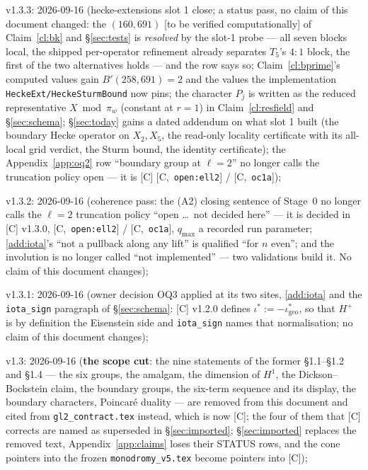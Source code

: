 \documentclass[11pt]{article}
\theoremstyle{remark}
\newcommand{\HA}[1]{[C,~\texttt{#1}]}      %
\newcommand{\VERIFY}{\textsf{[to be verified computationally]}}
\begin{document}
v1.3.3: 2026-09-16 (hecke-extensions slot 1 close; a status pass, no claim of
this document changed: the $(160,691)$ \VERIFY{} of Claim~\ref{cl:bk} and \S\ref{sec:tests} is
\emph{resolved} by the slot-1 probe --- all seven blocks local, the shipped per-operator
refinement already separates $T_5$'s $4{:}1$ block, the first of the two alternatives holds ---
and the row says so; Claim~\ref{cl:bprime}'s computed values gain $B'(258,691)=2$ and the values
the implementation \texttt{HeckeExt/HeckeSturmBound} now pins; the character $P_j$ is written
as the reduced representative $X\bmod\pi_w$ (constant at $r=1$) in Claim~\ref{cl:resfield}
and \S\ref{sec:schema}; \S\ref{sec:today} gains a dated addendum on what slot 1 built
(the boundary Hecke operator on $X_2,X_5$, the read-only locality certificate with its
all-local grid verdict, the Sturm bound, the identity certificate); the Appendix~\ref{app:oq2}
row ``boundary group at $\ell=2$'' no longer calls the truncation policy open --- it is
[C] \HA{open:ell2} / \HA{oc1a});

v1.3.2: 2026-09-16 (coherence pass: the (A2) closing sentence of
Stage~0 no longer calls the $\ell=2$ truncation policy ``open \ldots\ not decided
here'' --- it is decided in [C] v1.3.0, \HA{open:ell2} / \HA{oc1a}, $q_{\max}$ a recorded run
parameter; \ref{add:iota}'s ``not a pullback along any lift'' is qualified ``for $n$ even'';
and the involution is no longer called ``not implemented'' --- two validations build it. No
claim of this document changes);

v1.3.1: 2026-09-16 (owner decision OQ3 applied at its two sites,
\ref{add:iota} and the \texttt{iota\_sign} paragraph of \S\ref{sec:schema}: [C] v1.2.0
defines $\iota^{\ast}:=-\iota^{\ast}_{\mathrm{geo}}$, so that $H^+$ is by definition the
Eisenstein side and \texttt{iota\_sign} names that normalisation; no claim of this document
changes);

v1.3: 2026-09-16 (\textbf{the scope cut}: the nine statements of the
former \S1.1--\S1.2 and \S1.4 --- the six groups, the amalgam, the dimension of $H^1$, the
Dickson--Bockstein claim, the boundary groups, the six-term sequence and its display, the
boundary characters, Poincar\'e duality --- are removed from this document and cited from
\texttt{gl2\_contract.tex} instead, which is now [C]; the four of them that [C] corrects are
named as superseded in \S\ref{sec:imported}; \S\ref{sec:imported} replaces the removed text,
Appendix~\ref{app:claims} loses their STATUS rows, and the cone pointers into the frozen
\texttt{monodromy\_v5.tex} become pointers into [C]);
\end{document}
